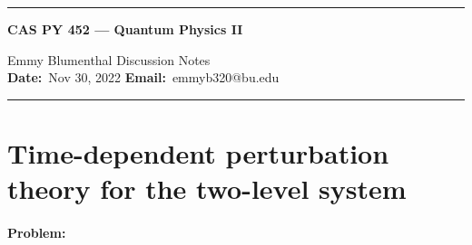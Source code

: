 \documentclass[10pt]{article}
\newcommand{\1}{\mathbf 1}
\begin{document}
\begin{center}
	\hrule
	\vspace{.4cm}
	{\textbf { \large CAS PY 452 --- Quantum Physics II}}
\end{center}
Emmy Blumenthal \hspace{\fill} \hspace{\fill}  \textbf{} Discussion Notes\  \\
\textbf{Date:}\  Nov 30, 2022   \hspace{\fill} \textbf{Email:}\ emmyb320@bu.edu 
\vspace{.4cm}
\hrule

\section*{Time-dependent perturbation theory for the two-level system}

\paragraph{Problem:}
\end{document}
